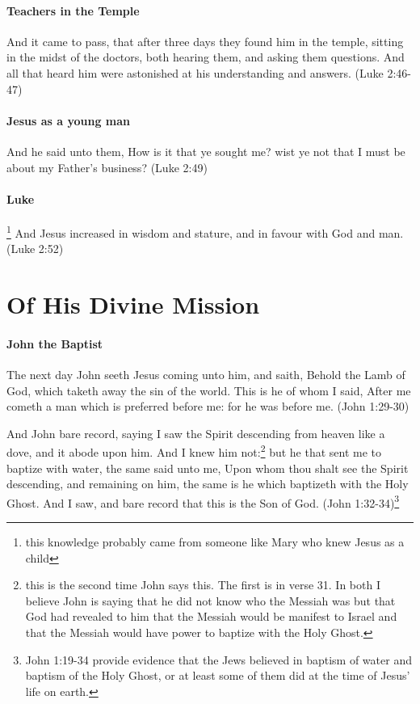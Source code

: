 \paragraph{Teachers in the Temple}
And it came to pass, that after three days they found him in the temple, sitting in the midst of the doctors, both hearing them, and asking them questions. And all that heard him were astonished at his understanding and answers. (Luke 2:46-47)

\paragraph{Jesus as a young man}
And he said unto them, How is it that ye sought me? wist ye not that I must be about my Father's business? (Luke 2:49)

\paragraph{Luke}\footnote{this knowledge probably came from someone like Mary who knew Jesus as a child}
And Jesus increased in wisdom and stature, and in favour with God and man. (Luke 2:52)

\section{Of His Divine Mission}

\paragraph{John the Baptist}
The next day John seeth Jesus coming unto him, and saith, Behold the Lamb of God, which taketh away the sin of the world. This is he of whom I said, After me cometh a man which is preferred before me: for he was before me. (John 1:29-30)

And John bare record, saying I saw the Spirit descending from heaven like a dove, and it abode upon him. And I knew him not:\footnote{this is the second time John says this. The first is in verse 31. In both I believe John is saying that he did not know who the Messiah was but that God had revealed to him that the Messiah would be manifest to Israel and that the Messiah would have power to baptize with the Holy Ghost.} but he that sent me to baptize with water, the same said unto me, Upon whom thou shalt see the Spirit descending, and remaining on him, the same is he which baptizeth with the Holy Ghost. And I saw, and bare record that this is the Son of God. (John 1:32-34)\footnote{John 1:19-34 provide evidence that the Jews believed in baptism of water and baptism of the Holy Ghost, or at least some of them did at the time of Jesus' life on earth.}

